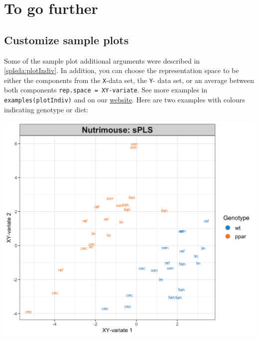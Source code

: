 \documentclass[]{book}
\newenvironment{Shaded}{\begin{snugshade}}{\end{snugshade}}
\newcommand{\KeywordTok}[1]{\textcolor[rgb]{0.13,0.29,0.53}{\textbf{#1}}}
\newcommand{\DataTypeTok}[1]{\textcolor[rgb]{0.13,0.29,0.53}{#1}}
\newcommand{\StringTok}[1]{\textcolor[rgb]{0.31,0.60,0.02}{#1}}
\newcommand{\OtherTok}[1]{\textcolor[rgb]{0.56,0.35,0.01}{#1}}
\newcommand{\OperatorTok}[1]{\textcolor[rgb]{0.81,0.36,0.00}{\textbf{#1}}}
\newcommand{\NormalTok}[1]{#1}
\theoremstyle{definition}
\theoremstyle{definition}
\theoremstyle{definition}
\theoremstyle{remark}
\begin{document}
\section{To go further}\label{pls-tgf}

\subsection{Customize sample plots}\label{pls:plotIndiv}

Some of the sample plot additional arguments were described in
\ref{splsda:plotIndiv}. In addition, you can choose the representation
space to be either the components from the \texttt{X}-data set, the
\texttt{Y}- data set, or an average between both components
\texttt{rep.space\ =\ \textquotesingle{}XY-variate\textquotesingle{}}.
See more examples in \texttt{examples(plotIndiv)} and on our
\href{http://mixomics.org/graphics/sample-plots/}{website}. Here are two
examples with colours indicating genotype or diet:

\begin{Shaded}
\end{Shaded}

\begin{center}\includegraphics[width=0.5\linewidth]{Figures/unnamed-chunk-3-1} \end{center}
\end{document}
